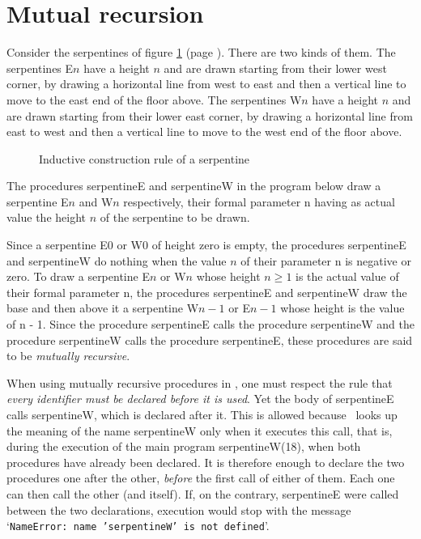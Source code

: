 \section{Mutual recursion}
Consider the serpentines of figure \ref{fig:serprec} (page \pageref{fig:serprec}). There are
two kinds of them. The serpentines
{\idt E$\scriptscriptstyle n$} have
a height $n$ and are drawn starting from their lower west corner, by drawing a
horizontal line from west to east and then a vertical line to move to the east end of the floor above.
The serpentines {\idt W$\scriptscriptstyle n$} have a height $n$ and are drawn
starting from their lower east corner, by drawing a horizontal line from east to west and then a
vertical line to move to the west end of the floor above.
\begin{figure}[htbp]
 \caption{Inductive construction rule of a serpentine}\label{fig:serprec}
\end{figure}

\noindent The procedures {\idt serpentineE} and {\idt serpentineW} in the program below
draw a serpentine {\idt E$\scriptscriptstyle n$} and
{\idt W$\scriptscriptstyle n$} respectively, their formal parameter {\idt n} having as actual value
the height $n$ of the serpentine to be drawn.

\noindent Since a serpentine
{\idt E$\scriptscriptstyle 0$} or {\idt W$\scriptscriptstyle 0$} of height zero is empty,
the procedures {\idt serpentineE} and {\idt serpentineW} do nothing when the value $n$ of their
parameter {\idt n} is negative or zero.
To draw a serpentine {\idt E$\scriptscriptstyle n$} or {\idt W$\scriptscriptstyle n$} whose
height $n \geq 1$ is the actual value of their formal parameter {\idt n}, the procedures
{\idt serpentineE} and {\idt serpentineW} draw the
base and then above it a serpentine {\idt W$\scriptscriptstyle n-1$}
or {\idt E$\scriptscriptstyle n-1$} whose height is the value of {\idt n - 1}. Since
the procedure {\idt serpentineE} calls the procedure {\idt serpentineW} and the procedure
{\idt serpentineW} calls the procedure {\idt serpentineE}, these procedures are said to be
{\em mutually recursive\/}.

When using mutually recursive procedures in \python, one must
respect the rule that {\em every identifier must be declared before it is
used}. Yet the body of {\idt serpentineE} calls {\idt serpentineW}, which is declared
after it. This is allowed because \python\ looks up the meaning of the name {\idt serpentineW} only
when it executes this call, that is, during the execution of the main program
{\idt serpentineW(18)}, when both procedures have already been declared. It is therefore enough to
declare the two procedures one after the other, {\em before} the first call of either of them.
Each one can then call the other (and itself). If, on the contrary, {\idt serpentineE} were called
between the two declarations, execution would stop with the message
`{\tt NameError:\ name 'serpentineW' is not defined}'.

